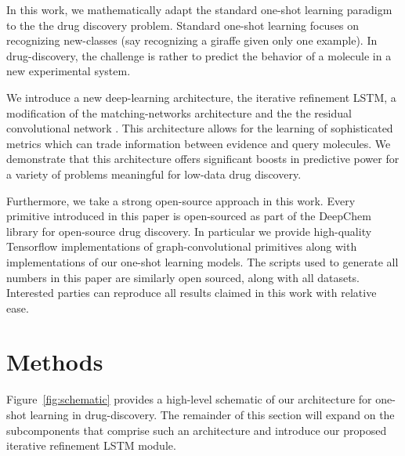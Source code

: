\documentclass[journal=jacsat,manuscript=article]{achemso}
\begin{document}
In this work, we mathematically adapt the standard one-shot learning paradigm to the the drug discovery problem. Standard one-shot learning focuses on recognizing new-classes (say recognizing a giraffe given only one example). In drug-discovery, the challenge is rather to predict the behavior of a molecule in a new experimental system.

We introduce a new deep-learning architecture, the iterative refinement LSTM, a modification of the matching-networks architecture and the the residual convolutional network \cite{he2016identity}. This architecture allows for the learning of sophisticated metrics which can trade information between evidence and query molecules. We demonstrate that this architecture offers significant boosts in predictive power for a variety of problems meaningful for low-data drug discovery.

Furthermore, we take a strong open-source approach in this work. Every primitive introduced in this paper is open-sourced as part of the DeepChem \cite{ram2016} library for open-source drug discovery. In particular we provide high-quality Tensorflow \cite{abadi2016tensorflow} implementations of graph-convolutional primitives along with implementations of our one-shot learning models. The scripts used to generate all numbers in this paper are similarly open sourced, along with all datasets. Interested parties can reproduce all results claimed in this work with relative ease.


\section{Methods}
Figure~\ref{fig:schematic} provides a high-level schematic of our architecture for one-shot learning in drug-discovery. The remainder of this section will expand on the subcomponents that comprise such an architecture and introduce our proposed iterative refinement LSTM module.
\end{document}
